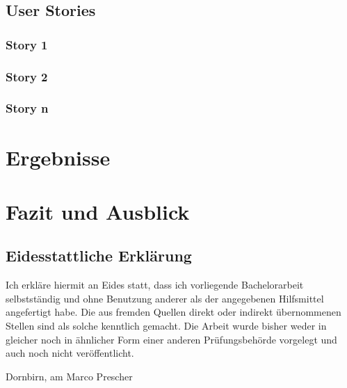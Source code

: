 \documentclass[a4paper, fontsize=11pt, parskip=half, twoside]{scrreprt}
\begin{document}
	\section{User Stories}
	
	\subsection{Story 1}
	
	\subsection{Story 2}
	
	\subsection{Story n}
	
	
	
	\chapter{Ergebnisse}
	
	
	
	\chapter{Fazit und Ausblick}
	
	
	\clearpage
	\printbibliography
	
	\clearpage
	\section*{Eidesstattliche Erklärung}
	Ich erkläre hiermit an Eides statt, dass ich vorliegende Bachelorarbeit selbstständig und ohne Benutzung anderer als der angegebenen Hilfsmittel angefertigt habe. 
	Die aus fremden Quellen direkt oder indirekt übernommenen Stellen sind als solche kenntlich gemacht. 
	Die Arbeit wurde bisher weder in gleicher noch in ähnlicher Form einer anderen Prüfungsbehörde vorgelegt und auch noch nicht veröffentlicht.
	
	\vspace{3cm}
	\noindent
	Dornbirn, am  \hfill Marco Prescher
	
	
\end{document}
